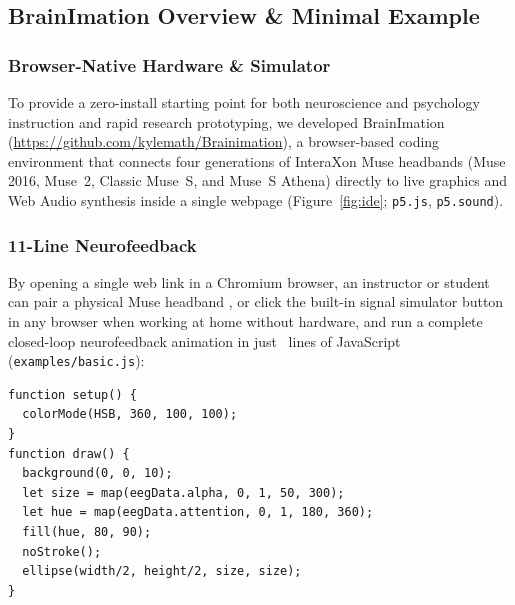 \documentclass[11pt]{article}
\begin{document}
\subsection{BrainImation Overview \& Minimal Example}

\subsubsection{Browser-Native Hardware \& Simulator}
To provide a zero-install starting point for both neuroscience and psychology instruction and rapid research prototyping, we developed BrainImation (\url{https://github.com/kylemath/Brainimation}), a browser-based coding environment that connects four generations of InteraXon Muse headbands (Muse 2016, Muse~2, Classic Muse~S, and Muse~S Athena) directly to live graphics and Web Audio synthesis inside a single webpage \citep{mccarthy2015p5} (Figure~\ref{fig:ide}; \texttt{p5.js}, \texttt{p5.sound}).

\subsubsection{11-Line Neurofeedback}
By opening a single web link in a Chromium browser, an instructor or student can pair a physical Muse headband \citep{krigolson2017choosing,kuziek2017transitioning,kuziek2018increasing}, or click the built-in signal simulator button in any browser when working at home without hardware, and run a complete closed-loop neurofeedback animation in just \ExLOCMin~lines of JavaScript (\texttt{examples/basic.js}):

\noindent\begin{minipage}{\textwidth}
\begin{lstlisting}
function setup() {
  colorMode(HSB, 360, 100, 100);
}
function draw() {
  background(0, 0, 10);
  let size = map(eegData.alpha, 0, 1, 50, 300);
  let hue = map(eegData.attention, 0, 1, 180, 360);
  fill(hue, 80, 90);
  noStroke();
  ellipse(width/2, height/2, size, size);
}
\end{lstlisting}
\end{minipage}
\vspace{4pt}
\end{document}

